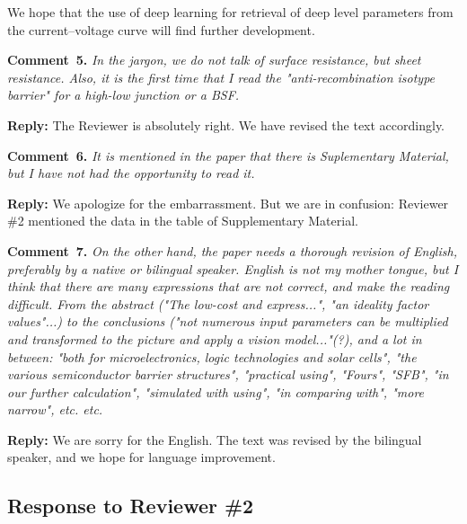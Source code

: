 \documentclass[num-refs]{wiley-article} %
\begin{document}
We hope that the use of deep
learning for retrieval of deep level parameters from the
current--voltage curve will find further development.

\vspace{1cm}
\noindent
\textcolor[rgb]{0.00,0.50,1.00}{\textbf{Comment~5.}}
\emph{In the jargon, we do not talk of surface resistance, but sheet resistance.
Also, it is the first time that I read the "anti-recombination isotype barrier" for a high-low junction or a BSF.}

\vspace{0.5cm}
\noindent
\textcolor[rgb]{0.51,0.00,0.00}{\textbf{Reply:}}
The Reviewer is absolutely right.
We have revised the text accordingly.

\vspace{1cm}
\noindent
\textcolor[rgb]{0.00,0.50,1.00}{\textbf{Comment~6.}}
\emph{It is mentioned in the paper that there is Suplementary Material, but I have not had the opportunity to read it.}

\vspace{0.5cm}
\noindent
\textcolor[rgb]{0.51,0.00,0.00}{\textbf{Reply:}}
We apologize for the embarrassment.
But we are in confusion:
Reviewer \#2 mentioned the data in the table of Supplementary Material.


\vspace{1cm}
\noindent
\textcolor[rgb]{0.00,0.50,1.00}{\textbf{Comment~7.}}
\emph{On the other hand, the paper needs a thorough revision of English, preferably by a native or bilingual speaker.
English is not my mother tongue, but I think that there are many expressions that are not correct, and make the reading difficult.
From the abstract ("The low-cost and express...", "an ideality factor values"...)
to the conclusions ("not numerous input parameters can be multiplied and transformed to the picture and apply a vision model..."(?),
and a lot in between: "both for microelectronics, logic technologies and solar cells",
"the various semiconductor barrier structures", "practical using", "Fours", "SFB", "in our further calculation",
"simulated with using", "in comparing with", "more narrow", etc. etc. }

\vspace{0.5cm}
\noindent
\textcolor[rgb]{0.51,0.00,0.00}{\textbf{Reply:}}
We are sorry for the English.
The text was revised by the bilingual speaker, and we hope for language improvement.




\subsection*{Response to Reviewer \#2 }
\end{document}
